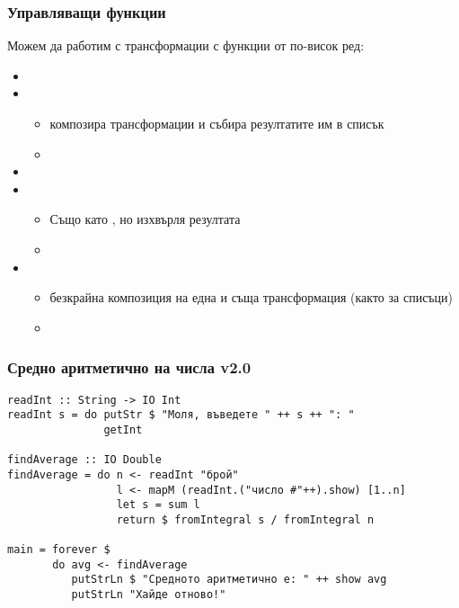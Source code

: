 \documentclass[alsotrans]{beamerswitch}
\begin{document}
\begin{frame}
  \frametitle{Управляващи функции}

  Можем да работим с трансформации с функции от по-висок ред:
  \begin{itemize}[<+->]
  \item {}
  \item {}
    \begin{itemize}
    \item композира трансформации и събира резултатите им в списък
    \item {} %
    \end{itemize}
  \item {}
  \item {}
    \begin{itemize}
    \item Също като , но изхвърля резултата
    \item {}
    \end{itemize}
  \item {}
    \begin{itemize}
    \item безкрайна композиция на една и съща трансформация (както  за списъци)
    \item {}
    \end{itemize}
  \end{itemize}
\end{frame}

\begin{frame}[fragile]
  \frametitle{Средно аритметично на числа v2.0}

  \small
\begin{lstlisting}
readInt :: String -> IO Int
readInt s = do putStr $ "Моля, въведете " ++ s ++ ": "
               getInt

findAverage :: IO Double
findAverage = do n <- readInt "брой"
                 l <- mapM (readInt.("число #"++).show) [1..n]
                 let s = sum l
                 return $ fromIntegral s / fromIntegral n

main = forever $
       do avg <- findAverage
          putStrLn $ "Средното аритметично е: " ++ show avg
          putStrLn "Хайде отново!"
\end{lstlisting}
\end{frame}
\end{document}
